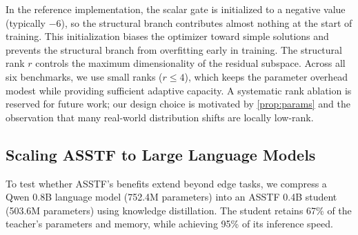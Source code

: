 \documentclass[11pt,a4paper]{article}
\theoremstyle{definition}
\begin{document}
In the reference implementation, the scalar gate is initialized to a negative value (typically $-6$), so the structural branch contributes almost nothing at the start of training. This initialization biases the optimizer toward simple solutions and prevents the structural branch from overfitting early in training. The structural rank $r$ controls the maximum dimensionality of the residual subspace. Across all six benchmarks, we use small ranks ($r \le 4$), which keeps the parameter overhead modest while providing sufficient adaptive capacity. A systematic rank ablation is reserved for future work; our design choice is motivated by \cref{prop:params} and the observation that many real-world distribution shifts are locally low-rank.

\subsection{Scaling ASSTF to Large Language Models}
\label{subsec:llm}

To test whether ASSTF's benefits extend beyond edge tasks, we compress a Qwen 0.8B language model (752.4M parameters) into an ASSTF 0.4B student (503.6M parameters) using knowledge distillation. The student retains 67\% of the teacher's parameters and memory, while achieving 95\% of its inference speed.

\begin{table}[t]
\centering
\small
\setlength{\tabcolsep}{4pt}
\caption{ASSTF-compressed Qwen 0.4B student versus the original Qwen 0.8B teacher. Results are preliminary and obtained on laptop-scale hardware (Apple M4 Max, MPS).}
\label{tab:llm}
\end{table}
\end{document}
